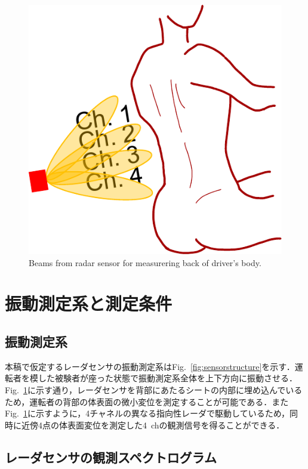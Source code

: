 \documentclass[10.5pt]{jarticle}
\begin{document}
\begin{figure}[tb]
  \centering
  \vspace{0pt} %
  \includegraphics[width=0.4\columnwidth]{sensorimg.pdf}
  \vspace{0pt} %
  \caption{Beams from radar sensor for measurering back of driver's body.}
  \vspace{-20pt} %
  \label{fig:sensorimg}
\end{figure}

\section{振動測定系と測定条件}
\subsection{振動測定系}

\hspace{1.0em}本稿で仮定するレーダセンサの振動測定系はFig.~\ref{fig:sensorstructure}を示す．運転者を模した被験者が座った状態で振動測定系全体を上下方向に振動させる．Fig.~\ref{fig:sensorimg}に示す通り，レーダセンサを背部にあたるシートの内部に埋め込んでいるため，運転者の背部の体表面の微小変位を測定することが可能である．またFig.~\ref{fig:sensorimg}に示すように，4チャネルの異なる指向性レーダで駆動しているため，同時に近傍4点の体表面変位を測定した4~chの観測信号を得ることができる．

\subsection{レーダセンサの観測スペクトログラム}
\end{document}

